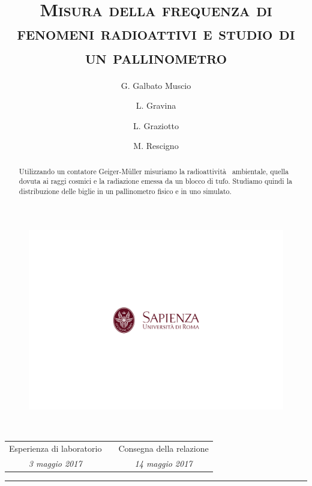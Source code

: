 \documentclass[10pt,oneside,a4paper]{article}
\title{\textsc{Misura della frequenza di fenomeni radioattivi e studio di un pallinometro}}
\author{\small{G. Galbato Muscio} \and \small{L. Gravina} \and \small{L. Graziotto} \and \small{M. Rescigno}}
\date{}
\begin{document}
	\begin{figure}
		\centering
		\includegraphics[scale=0.5, trim={2.8cm 8.9cm 0 9cm}, clip]{logo.png}
	\end{figure}
	\maketitle
	\begin{center} 
		 \\
		\vspace{1cm}
		\begin{tabular}{ccc}
			Esperienza di laboratorio && Consegna della relazione \\
			\emph{\small{3 maggio 2017}} && \emph{\small{14 maggio 2017}} \\
		\end{tabular} 
		
		\vspace{0.5cm}
		
	\end{center}
\hrule
\vspace{0.5cm}
\begin{abstract}
Utilizzando un contatore Geiger-M\"uller misuriamo la radioattività  ambientale, quella dovuta ai raggi cosmici e la radiazione emessa da un blocco di tufo. Studiamo quindi la distribuzione delle biglie in un pallinometro fisico e in uno simulato.	
\end{abstract}
\newpage
\tableofcontents %
\listoftables %
\listoffigures %
\pagebreak
\end{document}
